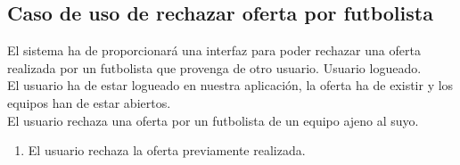 \subsection*{Caso de uso de rechazar oferta por futbolista}
 El sistema ha de proporcionará una interfaz para poder
rechazar una oferta realizada por un futbolista que provenga de otro usuario.
 Usuario logueado. \\
 El usuario ha de estar logueado en nuestra aplicación,
la oferta ha de existir y los equipos han de estar
abiertos. \\
 El usuario rechaza una oferta por un futbolista de un
equipo ajeno al suyo.  \\
\begin{enumerate}
\item El usuario rechaza la oferta previamente realizada.
\end{enumerate}

